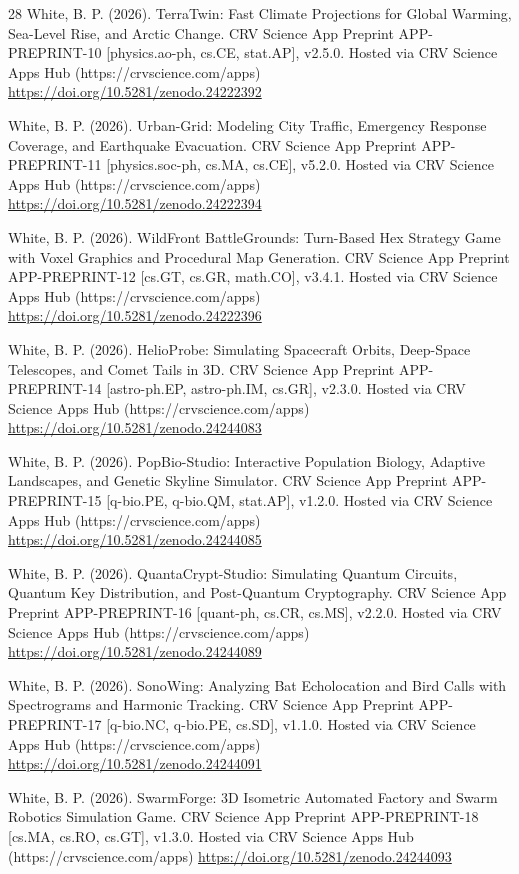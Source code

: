 \documentclass[10pt,letterpaper]{article}
\begin{document}
\begin{thebibliography}{28}
 White, B. P. (2026). TerraTwin: Fast Climate Projections for Global Warming, Sea-Level Rise, and Arctic Change. CRV Science App Preprint APP-PREPRINT-10 [physics.ao-ph, cs.CE, stat.AP], v2.5.0. Hosted via CRV Science Apps Hub (https://crvscience.com/apps) \url{https://doi.org/10.5281/zenodo.24222392}

 White, B. P. (2026). Urban-Grid: Modeling City Traffic, Emergency Response Coverage, and Earthquake Evacuation. CRV Science App Preprint APP-PREPRINT-11 [physics.soc-ph, cs.MA, cs.CE], v5.2.0. Hosted via CRV Science Apps Hub (https://crvscience.com/apps) \url{https://doi.org/10.5281/zenodo.24222394}

 White, B. P. (2026). WildFront BattleGrounds: Turn-Based Hex Strategy Game with Voxel Graphics and Procedural Map Generation. CRV Science App Preprint APP-PREPRINT-12 [cs.GT, cs.GR, math.CO], v3.4.1. Hosted via CRV Science Apps Hub (https://crvscience.com/apps) \url{https://doi.org/10.5281/zenodo.24222396}

 White, B. P. (2026). HelioProbe: Simulating Spacecraft Orbits, Deep-Space Telescopes, and Comet Tails in 3D. CRV Science App Preprint APP-PREPRINT-14 [astro-ph.EP, astro-ph.IM, cs.GR], v2.3.0. Hosted via CRV Science Apps Hub (https://crvscience.com/apps) \url{https://doi.org/10.5281/zenodo.24244083}

 White, B. P. (2026). PopBio-Studio: Interactive Population Biology, Adaptive Landscapes, and Genetic Skyline Simulator. CRV Science App Preprint APP-PREPRINT-15 [q-bio.PE, q-bio.QM, stat.AP], v1.2.0. Hosted via CRV Science Apps Hub (https://crvscience.com/apps) \url{https://doi.org/10.5281/zenodo.24244085}

 White, B. P. (2026). QuantaCrypt-Studio: Simulating Quantum Circuits, Quantum Key Distribution, and Post-Quantum Cryptography. CRV Science App Preprint APP-PREPRINT-16 [quant-ph, cs.CR, cs.MS], v2.2.0. Hosted via CRV Science Apps Hub (https://crvscience.com/apps) \url{https://doi.org/10.5281/zenodo.24244089}

 White, B. P. (2026). SonoWing: Analyzing Bat Echolocation and Bird Calls with Spectrograms and Harmonic Tracking. CRV Science App Preprint APP-PREPRINT-17 [q-bio.NC, q-bio.PE, cs.SD], v1.1.0. Hosted via CRV Science Apps Hub (https://crvscience.com/apps) \url{https://doi.org/10.5281/zenodo.24244091}

 White, B. P. (2026). SwarmForge: 3D Isometric Automated Factory and Swarm Robotics Simulation Game. CRV Science App Preprint APP-PREPRINT-18 [cs.MA, cs.RO, cs.GT], v1.3.0. Hosted via CRV Science Apps Hub (https://crvscience.com/apps) \url{https://doi.org/10.5281/zenodo.24244093}


\end{thebibliography}
\end{document}
